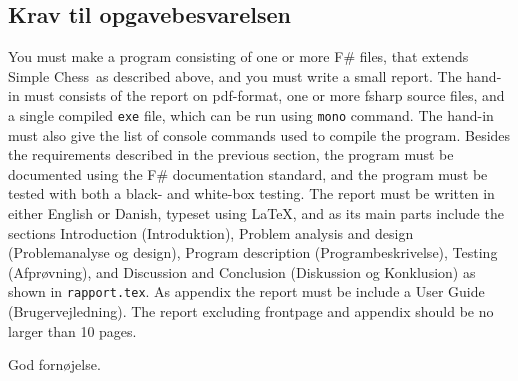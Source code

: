 \documentclass[a4paper,12pt]{article}
\newcommand{\chess}{Simple Chess}
\begin{document}
\subsection*{Krav til opgavebesvarelsen}
You must make a program consisting of one or more F\# files, that extends \chess\ as described above, and you must write a small report. The hand-in must consists of the report on pdf-format, one or more fsharp source files, and a single compiled \lstinline[language=console]{exe} file, which can be run using \lstinline[language=console]{mono} command. The hand-in must also give the list of console commands used to compile the program. Besides the requirements described in the previous section, the program must be documented using the F\# documentation standard, and the program must be tested with both a black- and white-box testing. The report must be written in either English or Danish, typeset using \LaTeX, and as its main parts include the sections Introduction (Introduktion), Problem analysis and design (Problemanalyse og design), Program description (Programbeskrivelse), Testing (Afprøvning), and Discussion and Conclusion (Diskussion og Konklusion) as shown in \texttt{rapport.tex}. As appendix the report must be include a User Guide (Brugervejledning). The report excluding frontpage and appendix should be no larger than 10 pages.
 
\flushright God fornøjelse.
\end{document}
